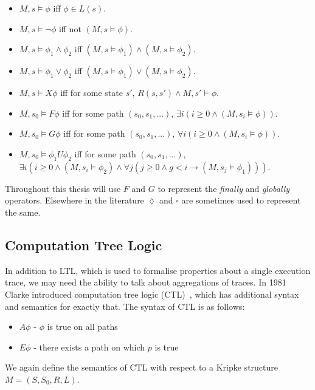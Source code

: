 \begin{itemize}
    \item $M, s \models \phi$ iff $\phi \in L(s)$.
    \item $M, s \models \lnot\phi$ iff not $(M, s \models \phi)$.
    \item $M, s \models \phi_1 \land \phi_2$ iff $(M, s \models \phi_1) \land (M, s \models \phi_2)$.
    \item $M, s \models \phi_1 \lor \phi_2$ iff $(M, s \models \phi_1) \lor (M, s \models \phi_2)$.
    \item $M, s \models X\phi$ iff for some state $s'$, $R(s, s') \land M, s' \models \phi$.
    \item $M, s_0 \models F\phi$ iff for some path $(s_0, s_1, ...)$, $\exists i (i \geq 0 \land (M, s_i \models \phi))$.
    \item $M, s_0 \models G\phi$ iff for some path $(s_0, s_1, ...)$, $\forall i (i \geq 0 \land (M, s_i \models \phi))$.
    \item $M, s_0 \models \phi_1 U \phi_2$ iff for some path $(s_0, s_1, ...)$, $\exists i (i \geq 0 \land (M, s_i \models \phi_2) \land \forall j (j \geq 0 \land g < i \to (M, s_j \models \phi_1)))$.
\end{itemize}

Throughout this thesis will use $F$ and $G$ to represent the \emph{finally} and
\emph{globally} operators. Elsewhere in the literature $\lozenge$ and $\square$
are sometimes used to represent the same.

\subsection{Computation Tree Logic}

In addition to LTL, which is used to formalise properties about a single
execution trace, we may need the ability to talk about aggregations of traces.
In 1981 Clarke introduced computation tree logic (CTL)~\cite{Clarke81}, which
has additional syntax and semantics for exactly that. The syntax of CTL is as
follows:

\begin{itemize}
    \item $A\phi$ - $\phi$ is true on all paths
    \item $E\phi$ - there exists a path on which $p$ is true
\end{itemize}

We again define the semantics of CTL with respect to a Kripke structure $M =
(S, S_0, R, L)$.

